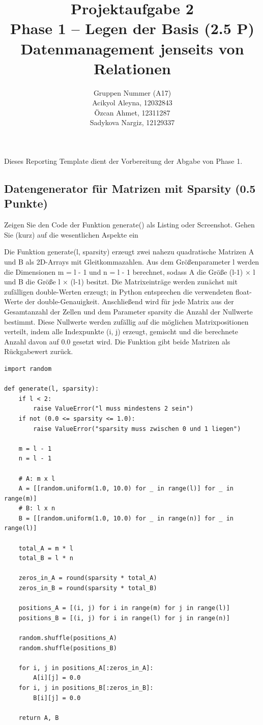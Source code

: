 \documentclass[11pt]{scrartcl}
\title{
  \textbf{\large Projektaufgabe 2 } \\
  Phase 1 – Legen der Basis (2.5 P) \\
  {\large Datenmanagement jenseits von Relationen}
}
\author{
  Gruppen Nummer (A17) \\
  \large Acikyol Aleyna, 12032843 \\
  \large Özcan Ahmet, 12311287 \\
  \large Sadykova Nargiz, 12129337 \\
}
\begin{document}
\maketitle\thispagestyle{empty}

Dieses Reporting Template dient der Vorbereitung der Abgabe von Phase 1.

\subsection*{Datengenerator für Matrizen mit Sparsity (0.5 Punkte)}

Zeigen Sie den Code der Funktion generate() als Listing oder Screenshot. Gehen Sie
(kurz) auf die wesentlichen Aspekte ein

{Die Funktion generate(l, sparsity) erzeugt zwei nahezu quadratische Matrizen A und B als 2D-Arrays mit Gleitkommazahlen. Aus dem Größenparameter l werden die Dimensionen m = l - 1 und n = l - 1 berechnet, sodass A die Größe (l-1) × l und B die Größe l × (l-1) besitzt. Die Matrixeinträge werden zunächst mit zufälligen double-Werten erzeugt; in Python entsprechen die verwendeten float-Werte der double-Genauigkeit. Anschließend wird für jede Matrix aus der Gesamtanzahl der Zellen und dem Parameter sparsity die Anzahl der Nullwerte bestimmt. Diese Nullwerte werden zufällig auf die möglichen Matrixpositionen verteilt, indem alle Indexpunkte (i, j) erzeugt, gemischt und die berechnete Anzahl davon auf 0.0 gesetzt wird. Die Funktion gibt beide Matrizen als Rückgabewert zurück.}

\begin{lstlisting}[style=dmrPython]
import random

def generate(l, sparsity):
    if l < 2:
        raise ValueError("l muss mindestens 2 sein")
    if not (0.0 <= sparsity <= 1.0):
        raise ValueError("sparsity muss zwischen 0 und 1 liegen")

    m = l - 1
    n = l - 1

    # A: m x l
    A = [[random.uniform(1.0, 10.0) for _ in range(l)] for _ in range(m)]
    # B: l x n
    B = [[random.uniform(1.0, 10.0) for _ in range(n)] for _ in range(l)]

    total_A = m * l
    total_B = l * n

    zeros_in_A = round(sparsity * total_A)
    zeros_in_B = round(sparsity * total_B)

    positions_A = [(i, j) for i in range(m) for j in range(l)]
    positions_B = [(i, j) for i in range(l) for j in range(n)]

    random.shuffle(positions_A)
    random.shuffle(positions_B)

    for i, j in positions_A[:zeros_in_A]:
        A[i][j] = 0.0
    for i, j in positions_B[:zeros_in_B]:
        B[i][j] = 0.0

    return A, B
\end{lstlisting}
\end{document}
